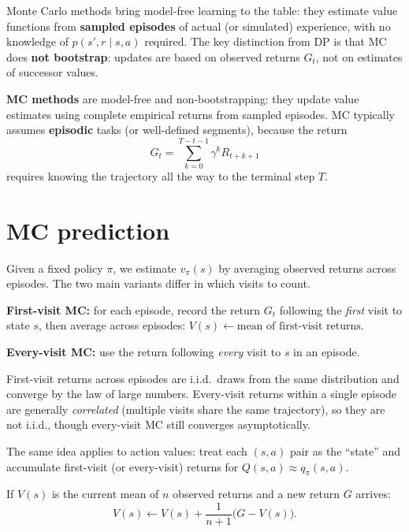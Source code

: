 \documentclass[11pt, oneside]{book}
\newcommand{\vpi}{v_{\pi}}              %
\newcommand{\qpi}{q_{\pi}}             %
\begin{document}
Monte Carlo methods bring model-free learning to the table: they estimate
value functions from \textbf{sampled episodes} of actual (or simulated)
experience, with no knowledge of $p(s',r\mid s,a)$ required. The key
distinction from DP is that MC does \textbf{not bootstrap}: updates are based
on observed returns $G_t$, not on estimates of successor values.

\begin{defbox}[title={Monte Carlo Methods}]
\textbf{MC methods} are model-free and non-bootstrapping: they update value
estimates using complete empirical returns from sampled episodes.
MC typically assumes \textbf{episodic} tasks (or well-defined segments),
because the return
\[
  G_t = \sum_{k=0}^{T-t-1} \gamma^k R_{t+k+1}
\]
requires knowing the trajectory all the way to the terminal step $T$.
\end{defbox}

\section{MC prediction}

Given a fixed policy $\pi$, we estimate $\vpi(s)$ by averaging observed
returns across episodes. The two main variants differ in which visits to count.

\begin{defbox}[title={First-Visit and Every-Visit MC Prediction}]
\textbf{First-visit MC:} for each episode, record the return $G_t$ following
the \emph{first} visit to state $s$, then average across episodes:
$V(s) \leftarrow \text{mean of first-visit returns}$.

\textbf{Every-visit MC:} use the return following \emph{every} visit to $s$
in an episode.

First-visit returns across episodes are i.i.d.\ draws from the same
distribution and converge by the law of large numbers.
Every-visit returns within a single episode are generally \emph{correlated}
(multiple visits share the same trajectory), so they are not i.i.d.,
though every-visit MC still converges asymptotically.
\end{defbox}

The same idea applies to action values: treat each $(s,a)$ pair as the
``state'' and accumulate first-visit (or every-visit) returns for
$Q(s,a) \approx \qpi(s,a)$.

\begin{thmbox}[title={Incremental Mean Update}]
If $V(s)$ is the current mean of $n$ observed returns and a new return $G$
arrives:
\[
  V(s) \leftarrow V(s) + \frac{1}{n+1}\bigl(G - V(s)\bigr).
\]
\end{thmbox}
\end{document}
